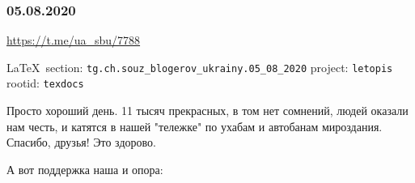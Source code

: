  
 
\subsubsection{05.08.2020}
\url{https://t.me/ua_sbu/7788}
  
\vspace{0.5cm}
 {\ifDEBUG\small\LaTeX~section: \verb|tg.ch.souz_blogerov_ukrainy.05_08_2020| project: \verb|letopis| rootid: \verb|texdocs|	\fi}
\vspace{0.5cm}
  
Просто хороший день. 11 тысяч прекрасных, в том нет сомнений, людей оказали нам
честь, и катятся в нашей "тележке" по ухабам и автобанам мироздания. Спасибо,
друзья! Это здорово. 

А вот поддержка наша и опора: 

